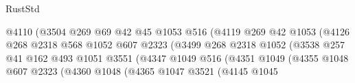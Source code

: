 \begin{lexlean}{RustStd}
\begin{coremodule}
                                          @4110
                                          (@3504
                                            @269
                                            @69
                                            @42
                                            @45
                                            @1053
                                            @516
                                            (@4119
                                              @269
                                              @42
                                              @1053
                                              (@4126
                                                @268
                                                @2318
                                                @568
                                                @1052
                                                @607
                                                @2323
                                                (@3499
                                                  @268
                                                  @2318
                                                  @1052
                                                  (@3538
                                                    @257
                                                    @41
                                                    @162
                                                    @493
                                                    @1051
                                                    @3551
                                                    (@4347
                                                      @1049
                                                      @516
                                                      (@4351
                                                        @1049
                                                        (@4355
                                                          @1048
                                                          @607
                                                          @2323
                                                          (@4360
                                                            @1048
                                                            (@4365
                                                              @1047
                                                              @3521
                                                              (@4145
                                                                @1045

\end{coremodule}
\end{lexlean}
